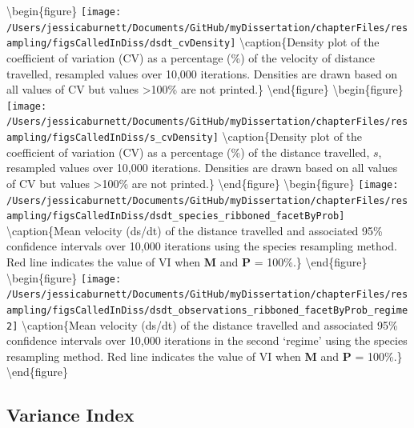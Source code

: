 \documentclass[12pt,twoside,openany]{reedthesis}
\begin{document}
\textbackslash begin\{figure\}
\texttt{[image: /Users/jessicaburnett/Documents/GitHub/myDissertation/chapterFiles/resampling/figsCalledInDiss/dsdt\_cvDensity]} \textbackslash caption\{Density plot of the coefficient of variation (CV) as a percentage (\%) of the velocity of distance travelled, resampled values over 10,000 iterations. Densities are drawn based on all values of CV but values \textgreater100\% are not printed.\}\label{fig:dsdtCV}
\textbackslash end\{figure\}
\textbackslash begin\{figure\}
\texttt{[image: /Users/jessicaburnett/Documents/GitHub/myDissertation/chapterFiles/resampling/figsCalledInDiss/s\_cvDensity]} \textbackslash caption\{Density plot of the coefficient of variation (CV) as a percentage (\%) of the distance travelled, \(s\), resampled values over 10,000 iterations. Densities are drawn based on all values of CV but values \textgreater100\% are not printed.\}\label{fig:sCV}
\textbackslash end\{figure\}
\textbackslash begin\{figure\}
\texttt{[image: /Users/jessicaburnett/Documents/GitHub/myDissertation/chapterFiles/resampling/figsCalledInDiss/dsdt\_species\_ribboned\_facetByProb]} \textbackslash caption\{Mean velocity (ds/dt) of the distance travelled and associated 95\% confidence intervals over 10,000 iterations using the species resampling method. Red line indicates the value of VI when \textbf{M} and \textbf{P} = 100\%.\}\label{fig:dsdtResamp}
\textbackslash end\{figure\}
\textbackslash begin\{figure\}
\texttt{[image: /Users/jessicaburnett/Documents/GitHub/myDissertation/chapterFiles/resampling/figsCalledInDiss/dsdt\_observations\_ribboned\_facetByProb\_regime2]} \textbackslash caption\{Mean velocity (ds/dt) of the distance travelled and associated 95\% confidence intervals over 10,000 iterations in the second `regime' using the species resampling method. Red line indicates the value of VI when \textbf{M} and \textbf{P} = 100\%.\}\label{fig:dsdtResampRegime2}
\textbackslash end\{figure\}

\hypertarget{variance-index}{%
\subsection{Variance Index}\label{variance-index}}
\end{document}
